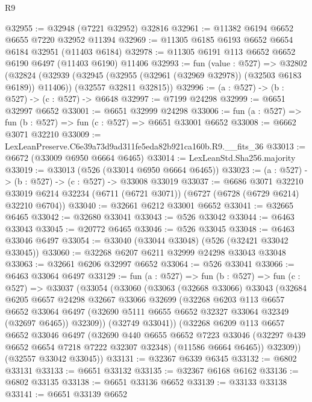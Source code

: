 \begin{lexlean}{R9}
\begin{coremodule}
@32955 := @32948 (@7221 @32952) @32816
@32961 := @11382 @6194 @6652 @6655 @7220 @32952 @11394
@32969 := @11305 @6185 @6193 @6652 @6654 @6184 @32951 (@11403 @6184)
@32978 := @11305 @6191 @113 @6652 @6652 @6190 @6497 (@11403 @6190) @11406
@32993 := fun (value : @527) =>
  @32802
    (@32824
      (@32939 (@32945 (@32955 (@32961 (@32969 @32978)) (@32503 @6183 @6189)) @11406))
      (@32557 @32811 @32815))
@32996 := (a : @527) -> (b : @527) -> (c : @527) -> @6648
@32997 := @7199 @24298
@32999 := @6651 @32997 @6652
@33001 := @6651 @32999 @24298
@33006 := fun (a : @527) => fun (b : @527) => fun (c : @527) => @6651 @33001 @6652
@33008 := @6662 @3071 @32210
@33009 := LexLeanPreserve.C6e39a73d9ad311fe5eda82b921ca160b.R9.__fits_36
@33013 := @6672 (@33009 @6950 @6664 @6465)
@33014 := LexLeanStd.Sha256.majority
@33019 := @33013 (@526 (@33014 @6950 @6664 @6465))
@33023 := (a : @527) -> (b : @527) -> (c : @527) -> @33008 @33019
@33037 := @6686
    @3071
    @32210
    @33019
    @6214
    @32234
    (@6711 (@6721 @3071))
    (@6727 (@6728 (@6729 @6214) @32210 @6704))
@33040 := @32661 @6212 @33001 @6652
@33041 := @32665 @6465
@33042 := @32680 @33041
@33043 := @526 @33042
@33044 := @6463 @33043
@33045 := @20772 @6465
@33046 := @526 @33045
@33048 := @6463 @33046 @6497
@33054 := @33040 (@33044 @33048) (@526 (@32421 @33042 @33045))
@33060 := @32268 @6207 @6211 @32999 @24298 @33043 @33048
@33063 := @32661 @6206 @32997 @6652
@33064 := @526 @33041
@33066 := @6463 @33064 @6497
@33129 := fun (a : @527) =>
  fun (b : @527) =>
  fun (c : @527) =>
  @33037
    (@33054
      (@33060
        (@33063
          (@32668 @33066)
          @33043
          (@32684
            @6205
            @6657
            @24298
            @32667
            @33066
            @32699
            (@32268
              @6203
              @113
              @6657
              @6652
              @33064
              @6497
              (@32690 @5111 @6655 @6652 @32327 @33064 @32349 (@32697 @6465))
              @32309))
          (@32749 @33041))
        (@32268
          @6209
          @113
          @6657
          @6652
          @33046
          @6497
          (@32690
            @440
            @6655
            @6652
            @7223
            @33046
            (@32297 @439 @6652 @6654 @7218 @7222 @32307 @32348)
            (@11586 @6664 @6465))
          @32309))
      (@32557 @33042 @33045))
@33131 := @32367 @6339 @6345
@33132 := @6802 @33131
@33133 := @6651 @33132
@33135 := @32367 @6168 @6162
@33136 := @6802 @33135
@33138 := @6651 @33136 @6652
@33139 := @33133 @33138
@33141 := @6651 @33139 @6652

\end{coremodule}
\end{lexlean}
